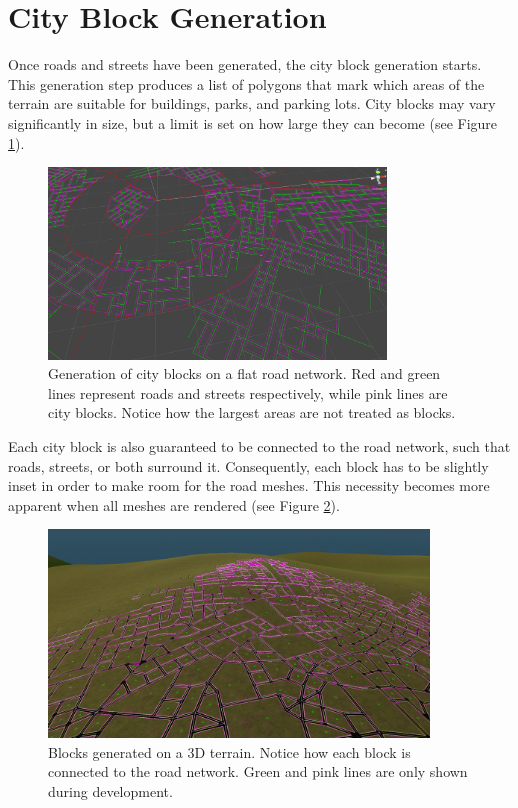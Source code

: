 \section{City Block Generation}

Once roads and streets have been generated, the city block generation starts.
This generation step produces a list of polygons that mark which areas of the terrain are suitable for buildings, parks, and parking lots.
City blocks may vary significantly in size, but a limit is set on how large they can become (see Figure \ref{fig:results_blockgen1}).

\begin{figure}[h!]
  \centering

  \includegraphics[width=0.8\textwidth]{figure/results_blockgen1.png}
  \caption{Generation of city blocks on a flat road network. Red and green lines represent roads and streets respectively, while pink lines are city blocks. Notice how the largest areas are not treated as blocks.}

  \label{fig:results_blockgen1}
\end{figure}

Each city block is also guaranteed to be connected to the road network, such that roads, streets, or both surround it.
Consequently, each block has to be slightly inset in order to make room for the road meshes.
This necessity becomes more apparent when all meshes are rendered (see Figure \ref{fig:results_blockgen2}).

\begin{figure}[h!]
  \centering

  \includegraphics[width=0.9\textwidth]{figure/results_blockgen2.png}
  \caption{Blocks generated on a 3D terrain. Notice how each block is connected to the road network. Green and pink lines are only shown during development.}

  \label{fig:results_blockgen2}
\end{figure}

